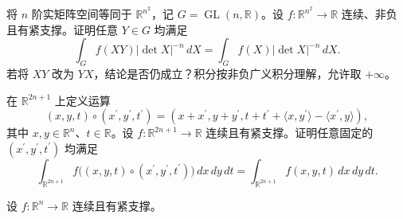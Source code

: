 \noindent\begin{minipage}{\textwidth}
将 $n$ 阶实矩阵空间等同于 $\mathbb R^{n^2}$，记 $G=\operatorname{GL}(n,\mathbb R)$。设 $f:\mathbb R^{n^2}\to\mathbb R$ 连续、非负且有紧支撑。证明任意 $Y\in G$ 均满足\[\int_G f(XY)|\det X|^{-n}\,dX=\int_G f(X)|\det X|^{-n}\,dX.\]若将 $XY$ 改为 $YX$，结论是否仍成立？积分按非负广义积分理解，允许取 $+\infty$。
\end{minipage}\par\vfill
\noindent\begin{minipage}{\textwidth}
在 $\mathbb R^{2n+1}$ 上定义运算\[(x,y,t)\circ(x^{\prime},y^{\prime},t^{\prime})=(x+x^{\prime},y+y^{\prime},t+t^{\prime}+\langle x,y^{\prime}\rangle-\langle x^{\prime},y\rangle),\]其中 $x,y\in\mathbb R^n$、$t\in\mathbb R$。设 $f:\mathbb R^{2n+1}\to\mathbb R$ 连续且有紧支撑。证明任意固定的 $(x^{\prime},y^{\prime},t^{\prime})$ 均满足\[\int_{\mathbb R^{2n+1}}f\bigl((x,y,t)\circ(x^{\prime},y^{\prime},t^{\prime})\bigr)\,dx\,dy\,dt=\int_{\mathbb R^{2n+1}}f(x,y,t)\,dx\,dy\,dt.\]
\end{minipage}\par\vfill
\noindent\begin{minipage}{\textwidth}
设 $f:\mathbb R^n\to\mathbb R$ 连续且有紧支撑。
\end{minipage}\par\vfill
